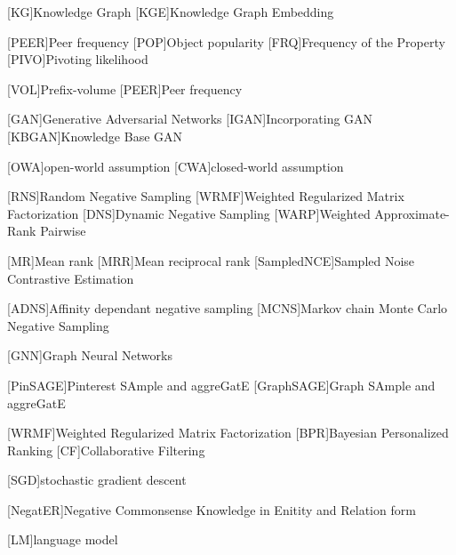 \begin{acronym}[ECU]

[KG]{Knowledge Graph}
[KGE]{Knowledge Graph Embedding}

[PEER]{Peer frequency}
[POP]{Object popularity }
[FRQ]{Frequency of the Property}
[PIVO]{Pivoting likelihood}

[VOL]{Prefix-volume}
[PEER]{Peer frequency}

[GAN]{Generative Adversarial Networks}
[IGAN]{Incorporating GAN}
[KBGAN]{Knowledge Base GAN}


[OWA]{open-world assumption}
[CWA]{closed-world assumption}

[RNS]{Random Negative Sampling}
[WRMF]{Weighted Regularized Matrix Factorization}
[DNS]{Dynamic Negative Sampling}
[WARP]{Weighted Approximate-Rank Pairwise}

[MR]{Mean rank}
[MRR]{Mean reciprocal rank}
[SampledNCE]{Sampled Noise Contrastive Estimation}

[ADNS]{Affinity dependant negative sampling}
[MCNS]{Markov chain Monte Carlo Negative Sampling}
    
[GNN]{Graph Neural Networks}

[PinSAGE]{Pinterest SAmple and aggreGatE}
[GraphSAGE]{Graph SAmple and aggreGatE}


[WRMF]{Weighted Regularized Matrix Factorization}
[BPR]{Bayesian Personalized Ranking}
[CF]{Collaborative Filtering}

[SGD]{stochastic gradient descent}

[NegatER]{Negative Commonsense Knowledge in Enitity and Relation form}

[LM]{language model}


\end{acronym}